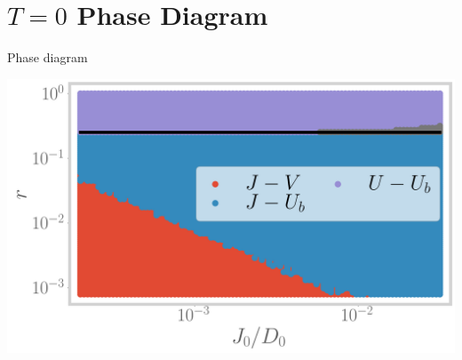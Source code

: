 \documentclass[11pt,aspectratio=169]{beamer}
\begin{document}
\section{\(T=0\) Phase Diagram}
\begin{frame}{Phase diagram}
\begin{minipage}{0.48\textwidth}
\vspace*{-14pt}
\includegraphics[width=\textwidth]{phase-map-MIT.png}
\end{minipage}
\begin{minipage}{0.48\textwidth}
\end{minipage}
\end{frame}
\end{document}

